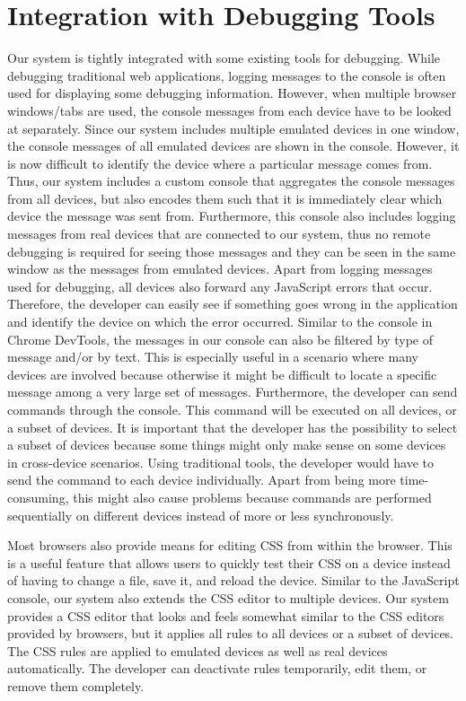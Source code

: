 \section{Integration with Debugging Tools}

Our system is tightly integrated with some existing tools for debugging. While debugging traditional web applications, logging messages to the console is often used for displaying some debugging information. However, when multiple browser windows/tabs are used, the console messages from each device have to be looked at separately. Since our system includes multiple emulated devices in one window, the console messages of all emulated devices are shown in the console. However, it is now difficult to identify the device where a particular message comes from. Thus, our system includes a custom console that aggregates the console messages from all devices, but also encodes them such that it is immediately clear which device the message was sent from. Furthermore, this console also includes logging messages from real devices that are connected to our system, thus no remote debugging is required for seeing those messages and they can be seen in the same window as the messages from emulated devices. Apart from logging messages used for debugging, all devices also forward any JavaScript errors that occur. Therefore, the developer can easily see if something goes wrong in the application and identify the device on which the error occurred. Similar to the console in Chrome DevTools, the messages in our console can also be filtered by type of message and/or by text. This is especially useful in a scenario where many devices are involved because otherwise it might be difficult to locate a specific message among a very large set of messages. Furthermore, the developer can send commands through the console. This command will be executed on all devices, or a subset of devices. It is important that the developer has the possibility to select a subset of devices because some things might only make sense on some devices in cross-device scenarios. Using traditional tools, the developer would have to send the command to each device individually. Apart from being more time-consuming, this might also cause problems because commands are performed sequentially on different devices instead of more or less synchronously. 

Most browsers also provide means for editing CSS from within the browser. This is a useful feature that allows users to quickly test their CSS on a device instead of having to change a file, save it, and reload the device. Similar to the JavaScript console, our system also extends the CSS editor to multiple devices. Our system provides a CSS editor that looks and feels somewhat similar to the CSS editors provided by browsers, but it applies all rules to all devices or a subset of devices. The CSS rules are applied to emulated devices as well as real devices automatically. The developer can deactivate rules temporarily, edit them, or remove them completely.


